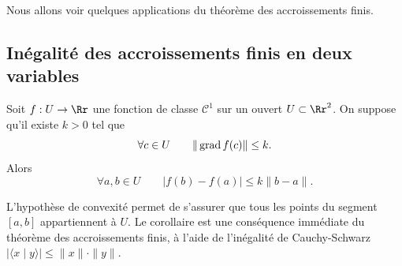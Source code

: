 \documentclass[11pt, class=report,crop=false]{standalone}
\begin{document}
\bigskip


Nous allons voir quelques applications du théorème des accroissements finis.


\subsection{Inégalité des accroissements finis en deux variables}

\begin{corollaire}
Soit $f: U \to \Rr$ une fonction de classe $\mathcal{C}^1$ sur un ouvert  $U \subset \Rr^2$. 
On suppose qu'il existe $k>0$ tel que
$$\forall c \in U \qquad \| \operatorname{grad} f (c) \| \le k.$$
Alors
$$\forall a,b \in U \qquad  \left| f(b)-f(a)  \right| \le k   \| b -a \|.$$
\end{corollaire}
L'hypothèse de convexité permet de s'assurer que tous les points du segment $[a,b]$ appartiennent à $U$. Le corollaire est une conséquence immédiate du théorème des accroissements finis, à l'aide de l'inégalité de Cauchy-Schwarz $|\langle x \mid y \rangle| \le \|x\| \cdot \| y \|$. 
\end{document}

